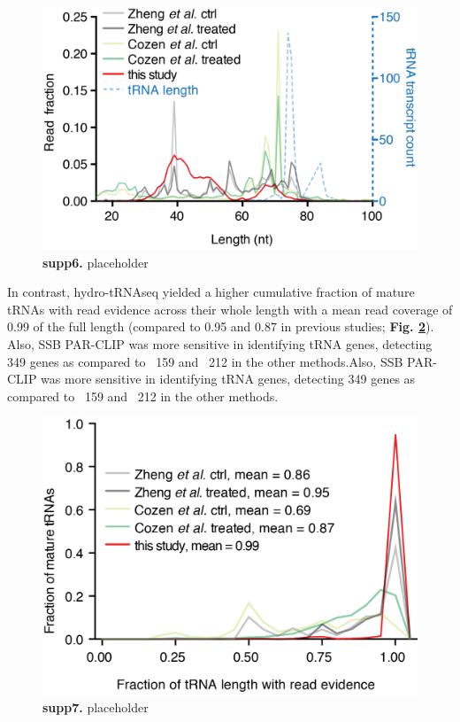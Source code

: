 \documentclass[12pt]{rockefeller}
\begin{document}
\begin{figure}[!ht]%
\centering
\includegraphics{supp6.png}%
\caption[supp6]
{\textbf{supp6.}
placeholder}
\centering
\label{supp6}%
\end{figure}

In contrast, hydro-tRNAseq yielded a higher cumulative fraction of mature tRNAs with read evidence across their whole length with a mean read coverage of 0.99 of the full length (compared to 0.95 and 0.87 in previous studies; \textbf{Fig. \ref{supp7}}). Also, SSB PAR-CLIP was more sensitive in identifying tRNA genes, detecting 349 genes as compared to ~159 and ~212 in the other methods.Also, SSB PAR-CLIP was more sensitive in identifying tRNA genes, detecting 349 genes as compared to ~159 and ~212 in the other methods.

\begin{figure}[!ht]%
\centering
\includegraphics{supp7.png}%
\caption[supp7]
{\textbf{supp7.}
placeholder}
\centering
\label{supp7}%
\end{figure}
\end{document}
